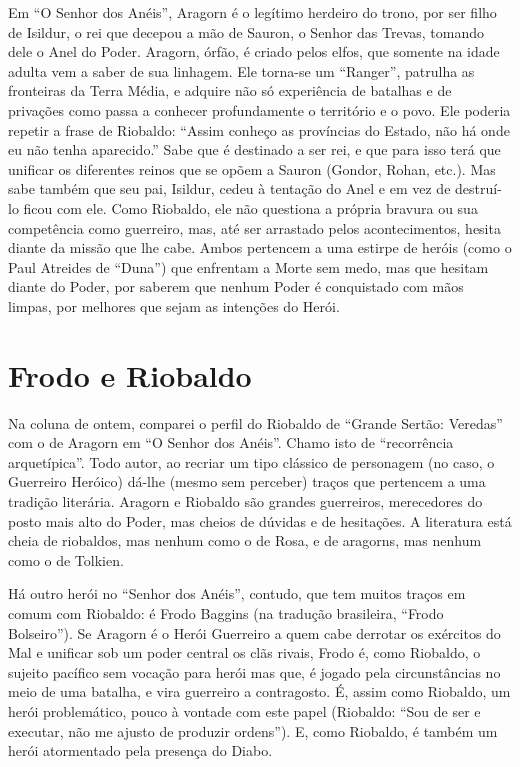 Em “O Senhor dos Anéis”, Aragorn é o legítimo herdeiro do trono, por
ser filho de Isildur, o rei que decepou a mão de Sauron, o Senhor das
Trevas, tomando dele o Anel do Poder. Aragorn, órfão, é criado pelos
elfos, que somente na idade adulta vem a saber de sua linhagem. Ele
torna-se um “Ranger”, patrulha as fronteiras da Terra Média, e
adquire não só experiência de batalhas e de privações como passa a
conhecer profundamente o território e o povo. Ele poderia repetir a
frase de Riobaldo: “Assim conheço as províncias do Estado, não há
onde eu não tenha aparecido.” Sabe que é destinado a ser rei, e que
para isso terá que unificar os diferentes reinos que se opõem a
Sauron (Gondor, Rohan, etc.). Mas sabe também que seu pai, Isildur,
cedeu à tentação do Anel e em vez de destruí-lo ficou com ele. Como
Riobaldo, ele não questiona a própria bravura ou sua competência como
guerreiro, mas, até ser arrastado pelos acontecimentos, hesita diante
da missão que lhe cabe. Ambos pertencem a uma estirpe de heróis (como
o Paul Atreides de “Duna”) que enfrentam a Morte sem medo, mas que
hesitam diante do Poder, por saberem que nenhum Poder é conquistado
com mãos limpas, por melhores que sejam as intenções do Herói. 

\chapter{Frodo e Riobaldo}

Na coluna de ontem, comparei o perfil do Riobaldo de “Grande Sertão:
Veredas” com o de Aragorn em “O Senhor dos Anéis”. Chamo isto de
“recorrência arquetípica”. Todo autor, ao recriar um tipo clássico de
personagem (no caso, o Guerreiro Heróico) dá-lhe (mesmo sem perceber)
traços que pertencem a uma tradição literária. Aragorn e Riobaldo são
grandes guerreiros, merecedores do posto mais alto do Poder, mas
cheios de dúvidas e de hesitações. A literatura está cheia de
riobaldos, mas nenhum como o de Rosa, e de aragorns, mas nenhum como
o de Tolkien. 

Há outro herói no “Senhor dos Anéis”, contudo, que tem muitos traços
em comum com Riobaldo: é Frodo Baggins (na tradução brasileira,
“Frodo Bolseiro”). Se Aragorn é o Herói Guerreiro a quem cabe
derrotar os exércitos do Mal e unificar sob um poder central os clãs
rivais, Frodo é, como Riobaldo, o sujeito pacífico sem vocação para
herói mas que, é jogado pela circunstâncias no meio de uma batalha, e
vira guerreiro a contragosto. É, assim como Riobaldo, um herói
problemático, pouco à vontade com este papel (Riobaldo: “Sou de ser e
executar, não me ajusto de produzir ordens”). E, como Riobaldo, é
também um herói atormentado pela presença do Diabo.

